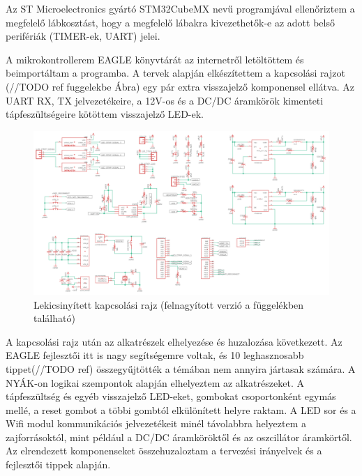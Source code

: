 \documentclass[../main.tex]{subfiles}
\begin{document}
            Az ST Microelectronics gyártó STM32CubeMX nevű programjával ellenőriztem a megfelelő lábkosztást, hogy a megfelelő lábakra kivezethetők-e az adott belső perifériák (TIMER-ek, UART) jelei. 
            
            A mikrokontrollerem EAGLE könyvtárát az internetről letöltöttem és beimportáltam a programba. A tervek alapján elkészítettem a kapcsolási rajzot (//TODO ref fuggelekbe Ábra) egy pár extra visszajelző komponensel ellátva. Az UART RX, TX jelvezetékeire, a 12V-os és a DC/DC áramkörök kimenteti tápfeszültségeire kötöttem visszajelző LED-ek. 
            
            \begin{figure}[h!]
                \centering
                    \includegraphics[width=12cm]{resources/pcb_res/schematic_v02.png}
                \caption{Lekicsinyített kapcsolási rajz (felnagyított verzió a függelékben található)}
                \label{fig:schamtic_v02}
            \end{figure}
            
            
            A kapcsolási rajz után az alkatrészek elhelyezése és huzalozása következett. Az EAGLE fejlesztői itt is nagy segítségemre voltak, és 10 leghasznosabb tippet(//TODO ref) 
            összegyűjtötték a témában nem annyira jártasak számára.
            A NYÁK-on logikai szempontok alapján elhelyeztem az alkatrészeket. A tápfeszültség és egyéb visszajelző LED-eket, gombokat csoportonként egymás mellé, a reset gombot a többi gombtól elkülönített helyre raktam. A LED sor és a Wifi modul kommunikációs jelvezetékeit minél távolabbra helyeztem a zajforrásoktól, mint például a DC/DC áramköröktől és az oszcillátor áramkörtől. Az elrendezett komponenseket összehuzaloztam a tervezési irányelvek és a fejlesztői tippek alapján. 
            
\end{document}
